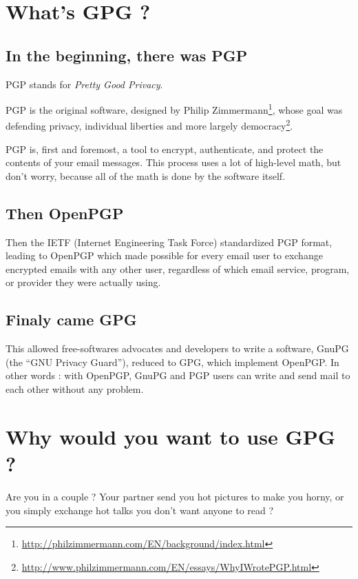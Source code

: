 \section{What's GPG ?}\label{whats-gpg}

\subsection{In the beginning, there was PGP}\label{in-the-beginning-there-was-pgp}

PGP stands for \emph{Pretty Good Privacy}.

PGP is the original software, designed by Philip
Zimmermann\footnote{\url{http://philzimmermann.com/EN/background/index.html}}, whose goal was defending
privacy, individual liberties and more largely democracy\footnote{\url{http://www.philzimmermann.com/EN/essays/WhyIWrotePGP.html}}.

PGP is, first and foremost, a tool to encrypt, authenticate, and protect the contents of your email messages. This process uses a lot of
high-level math, but don't worry, because all of the math is done by the software itself.

\subsection{Then OpenPGP}\label{then-openpgp}

Then the IETF (Internet Engineering Task Force) standardized PGP format, leading to OpenPGP which made possible for every email user to exchange
encrypted emails with any other user, regardless of which email service, program, or provider they were actually using.

\subsection{Finaly came GPG}\label{finaly-came-gpg}

This allowed free-softwares advocates and developers to write a
software, GnuPG (the ``GNU Privacy Guard''), reduced to GPG, which implement OpenPGP. In other words :
with OpenPGP, GnuPG and PGP users can write and send mail to each other without any problem.

\section{Why would you want to use GPG ?}\label{why-would-you-want-to-use-gpg}

Are you in a couple ? Your partner send you hot pictures to make you horny, or you simply exchange hot talks you don't want anyone to read ?


